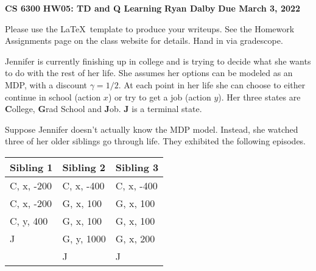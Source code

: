 \documentclass[12pt]{article}
\begin{document}
\begin{center}
{\bf CS 6300} \hfill {\large\bf HW05: TD and Q Learning} \hfill {\bf Ryan Dalby} \hfill {\bf Due March 3, 2022}
\end{center}

\noindent
Please use the \LaTeX\ template to produce your writeups. See the
Homework Assignments page on the class website for details.  Hand in
via gradescope.

Jennifer is currently finishing up in college and is trying to decide
what she wants to do with the rest of her life.  She assumes her
options can be modeled as an MDP, with a discount $\gamma=1/2$.  At
each point in her life she can choose to either continue in school
(action $x$) or try to get a job (action $y$).  Her three states are
{\bf C}ollege, {\bf G}rad School and {\bf J}ob.  {\bf J} is a terminal
state.

Suppose Jennifer doesn't actually know the MDP model.  Instead, she
watched three of her older siblings go through life.  They exhibited
the following episodes.

\begin{center}
\begin{tabular}{|l|l|l|} \hline
{\bf Sibling 1} & {\bf Sibling 2} & {\bf Sibling 3} \\ \hline
    C, x, -200 & C, x, -400 & C, x, -400 \\
    C, x, -200 & G, x,  100 & G, x,  100 \\
    C, y,  400 & G, x,  100 & G, x,  100 \\
    J          & G, y, 1000 & G, x,  200 \\
               & J          & J          \\ \hline
\end{tabular}
\end{center}
\end{document}
